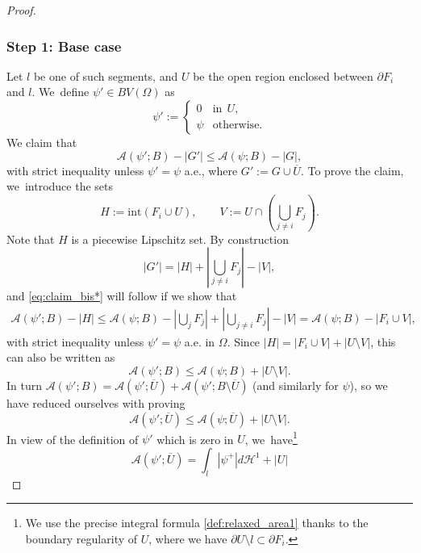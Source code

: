 \documentclass[11pt]{article}
\numberwithin{equation}{section}
\let\Om\Omega
\theoremstyle{definition}
\begin{document}
\begin{proof}
\subsubsection*{Step 1: Base case} Let $l$ be one of such segments, and
$U$ be the open region enclosed between $\partial F_i$ and $l$. We~define $\psi'\in BV(\Om)$ as
\begin{equation*}
\psi':=\begin{cases}
0&\text{in}\ \ U,\\
\psi &\text{otherwise}.
\end{cases}
\end{equation*}
We claim that
\begin{equation}\label{eq:claim_bis*}
\mathcal{A}(\psi';B)-|G'|\le\mathcal{A}(\psi;B)-|G|,
\end{equation}
with strict inequality unless $\psi'=\psi$ a.e., where $G':= G \cup
\overline U$.
To prove the claim, we~introduce the sets
\[
H:=\mathrm{int}(F_i\cup U),\qquad
V:=U\cap(\bigcup_{j\neq i}F_j).
\]
Note that $H$ is a piecewise Lipschitz set.
By construction
\begin{equation*}
|G'|=|{H}|+ |\bigcup_{j\neq i}F_j|-|V|,
\end{equation*}
and \eqref{eq:claim_bis*} will follow if we show that
\begin{equation*}
\begin{split}
\mathcal{A}(\psi';B)-|{H}| \le \mathcal{A}(\psi;B)-|\bigcup_j F_j|+|\bigcup_{j\neq i}F_j|-|V|=\mathcal{A}(\psi;B)-|F_i\cup V|,
\end{split}
\end{equation*}
with strict inequality unless $\psi'=\psi$ a.e. in $\Om$.
Since $|H|=|F_i\cup V|+|U\setminus V|$, this can also be written as
\begin{equation*}
\mathcal{A}(\psi';B)
\le\mathcal{A}(\psi;B)+|U\setminus V|.
\end{equation*}
In turn $\mathcal{A}(\psi';B)=\mathcal{A}(\psi';\overline U)+\mathcal{A}(\psi';B\setminus \overline U)$ (and similarly for $\psi$), so we have reduced ourselves with proving
\begin{equation}\label{eq:claim_tris**}
\mathcal{A}(\psi';\overline U)
\le\mathcal{A}(\psi;\overline U)+|U\setminus V|.
\end{equation}
In view of the definition of $\psi'$ which is zero
in $U$, we~have\footnote{We use the precise integral formula \eqref{def:relaxed_area1} thanks to the boundary regularity of $U$, where we have $\partial U\setminus l\subset \partial F_i$.}
\[
\mathcal{A}(\psi';\overline U)=\int_l|{\psi}^+|d\mathcal H^1+|U|
\]
\end{proof}
\end{document}
